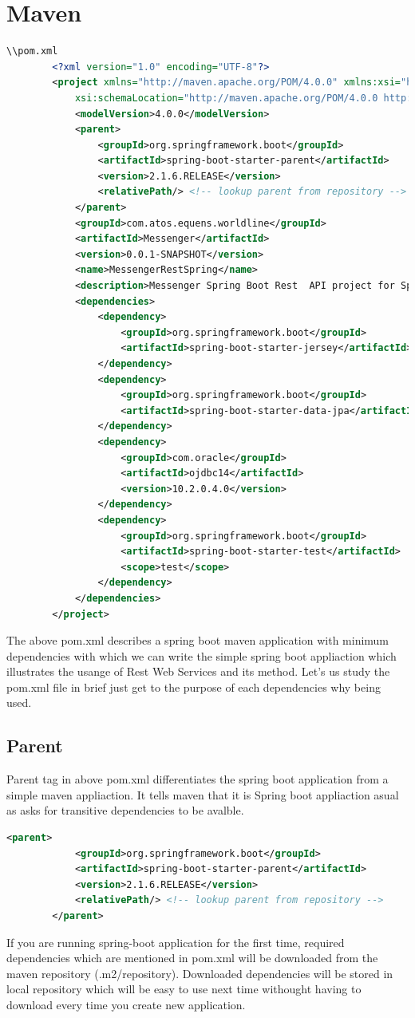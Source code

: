 \documentclass{report}
\begin{document}
	\section{Maven}
	\begin{lstlisting}[language = xml]
	\\pom.xml
		<?xml version="1.0" encoding="UTF-8"?>
		<project xmlns="http://maven.apache.org/POM/4.0.0" xmlns:xsi="http://www.w3.org/2001/XMLSchema-instance"
			xsi:schemaLocation="http://maven.apache.org/POM/4.0.0 http://maven.apache.org/xsd/maven-4.0.0.xsd">
			<modelVersion>4.0.0</modelVersion>
			<parent>
				<groupId>org.springframework.boot</groupId>
				<artifactId>spring-boot-starter-parent</artifactId>
				<version>2.1.6.RELEASE</version>
				<relativePath/> <!-- lookup parent from repository -->
			</parent>
			<groupId>com.atos.equens.worldline</groupId>
			<artifactId>Messenger</artifactId>
			<version>0.0.1-SNAPSHOT</version>
			<name>MessengerRestSpring</name>
			<description>Messenger Spring Boot Rest  API project for Spring Boot</description>
			<dependencies>
				<dependency>
					<groupId>org.springframework.boot</groupId>
					<artifactId>spring-boot-starter-jersey</artifactId>
				</dependency>
				<dependency>
					<groupId>org.springframework.boot</groupId>
					<artifactId>spring-boot-starter-data-jpa</artifactId>
				</dependency>
				<dependency>
					<groupId>com.oracle</groupId>
					<artifactId>ojdbc14</artifactId>
					<version>10.2.0.4.0</version>
				</dependency>
				<dependency>
					<groupId>org.springframework.boot</groupId>
					<artifactId>spring-boot-starter-test</artifactId>
					<scope>test</scope>
				</dependency>
			</dependencies>
		</project>
	\end{lstlisting}
	The above pom.xml describes a spring boot maven application with minimum dependencies with which we can write the simple spring boot appliaction which illustrates the usange of Rest Web Services and its method.
	Let’s us study the pom.xml file in brief just get to the purpose of each dependencies why being used.
	\subsection{Parent}
	Parent tag in above pom.xml differentiates the spring boot application from a simple maven appliaction. It tells maven that it is Spring boot appliaction asual as asks for transitive dependencies to be avalble.
		\begin{lstlisting}[language=xml]
		<parent>
			<groupId>org.springframework.boot</groupId>
			<artifactId>spring-boot-starter-parent</artifactId>
			<version>2.1.6.RELEASE</version>
			<relativePath/> <!-- lookup parent from repository -->
		</parent>
		\end{lstlisting}
	If you are running spring-boot application for the first time, required dependencies which are mentioned in pom.xml will be downloaded from the maven repository (.m2/repository). Downloaded dependencies will be stored in local repository which will be easy to use  next time withought having to download every time you create new application.
\end{document}

